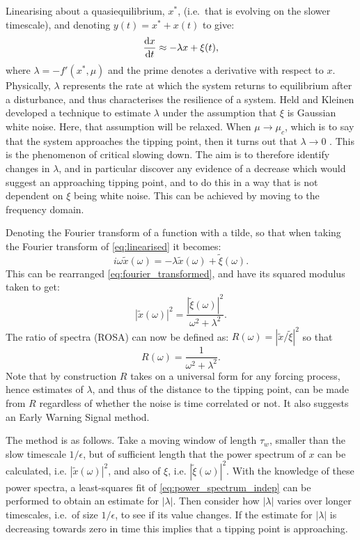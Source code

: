 Linearising about a quasiequilibrium, $x^*$, (i.e.\ that is evolving on the slower timescale), and denoting
$y(t) = x^* + x(t)$ to give:
\begin{equation}
  \label{eq:linearised}
  \dv{x}{t} \approx -\lambda x + \xi(t),
\end{equation}
where $\lambda = -f'(x^*,\mu)$ and the prime denotes a derivative with respect to $x$. 
Physically, $\lambda$ represents the rate at which the system returns to equilibrium after
a disturbance, and thus characterises the resilience of a system. Held and Kleinen \parencite{Held2004} developed a technique to estimate $\lambda$
under the assumption that $\xi$ is Gaussian white noise. Here, 
that assumption will be relaxed.
When $\mu \rightarrow \mu_c$, which is to say that the system approaches
the tipping point, then it turns out that $\lambda \rightarrow 0$ \parencite{guckenheimer2013}. This is the phenomenon of critical slowing down. The aim is to therefore
identify changes in $\lambda$, and in particular discover any evidence of a decrease which would suggest an approaching tipping point, and
to do this in a way that is not dependent on $\xi$ being white noise. This can be achieved by moving to the frequency domain.

Denoting the Fourier transform of a function with a tilde, so that when taking the Fourier transform of \cref{eq:linearised} it becomes:
\begin{equation}
  \label{eq:fourier_transformed}
  i\omega \tilde{x}(\omega) = -\lambda \tilde{x}(\omega) + \tilde{\xi}(\omega).
\end{equation}
This can be rearranged \cref{eq:fourier_transformed}, and have its squared modulus taken to get:
\begin{equation}
  \label{eq:power_spectra}
  |\tilde{x}(\omega)|^2 = \frac{|\tilde{\xi}(\omega)|^2}{\omega^2 + \lambda^2}.
\end{equation}
The ratio of spectra (ROSA) can now be defined as:
$R(\omega) = |\tilde{x}/\tilde{\xi}|^2$ so that
\begin{equation}
    \label{eq:power_spectrum_indep}
    R(\omega) = \frac{1}{\omega^2 + \lambda^2}.
\end{equation}
Note that by construction $R$ takes on a universal form for any 
forcing process,
hence estimates of $\lambda$, and thus of the 
distance to the tipping point, can be made from $R$ regardless 
of whether the noise is time correlated or not. It also suggests an
Early Warning Signal method.

The method is as follows.
Take a moving window of length $\tau_w$, smaller than the slow timescale $1/\epsilon$, but of sufficient
length that the power spectrum of $x$ can be calculated, i.e. $|\tilde{x}(\omega)|^2$, and also of
$\xi$, i.e. $|\tilde{\xi}(\omega)|^2$. With the knowledge of these power spectra, a least-squares
fit of \cref{eq:power_spectrum_indep} can be performed to obtain an estimate for $|\lambda|$.  Then consider how $|\lambda|$ varies over longer timescales, i.e.\ of
size $1/\epsilon$, to see if its value changes. 
If the estimate for $|\lambda|$ is decreasing towards zero in time this implies that a tipping point is approaching. 

